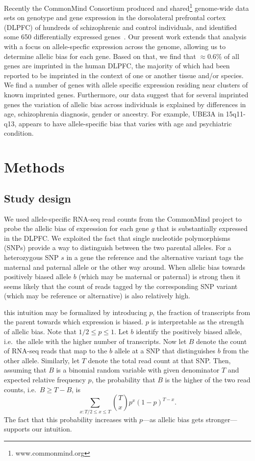 \documentclass[12pt,letterpaper]{article}
\begin{document}
Recently the CommonMind Consortium produced and
shared\footnote{www.commonmind.org} genome-wide data sets on genotype and gene
expression in the dorsolateral prefrontal cortex (DLPFC) of hundreds of
schizophrenic and control individuals, and identified some 650 differentially
expressed genes~\cite{Fromer2016a}. Our present work extends that analysis
with a focus on allele-specfic expression across the genome, allowing us to
determine allelic bias for each gene.  Based on that, we find that \(\approx
0.6\%\) of all genes are imprinted in the human DLPFC, the majority of which
had been reported to be imprinted in the context of one or another tissue
and/or species. We find a number of genes with allele specific expression
residing near clusters of known imprinted genes. Furthermore, our data suggest
that for several imprinted genes the variation of allelic bias across
individuals is explained by differences in age, schizophrenia diagnosis,
gender or ancestry.  For example, UBE3A in 15q11-q13, appears to have
allele-specific bias that varies with age and psychiatric condition.

\section{Methods}

\subsection{Study design}

We used allele-specific RNA-seq read counts from the CommonMind project to
probe the allelic bias of expression for each gene \(g\) that is
substantially expressed in the DLPFC.  We exploited the fact that single
nucleotide polymorphisms (SNPs) provide a way to distinguish between the two
parental alleles.  For a heterozygous SNP \(s\) in a gene the reference and the
alternative variant tags the maternal and paternal allele or the other way
around.  When allelic bias towards positively biased allele \(b\) (which may
be maternal or paternal) is strong then it seems likely that the count of
reads tagged by the corresponding SNP variant (which may be reference or
alternative) is also relatively high.

this intuition may be formalized by introducing \(p\), the fraction of
transcripts from the parent towards which expression is biased.  \(p\) is
interpretable as the strength of allelic bias.  Note that \(1/2\le p\le 1\).
Let \(b\) identify the positively biased allele, i.e.~the allele with the
higher number of transcripts.  Now let \(B\) denote the count of RNA-seq reads
that map to the \(b\) allele at a SNP that distinguishes \(b\) from the other
allele.  Similarly, let \(T\) denote the total read count at that SNP.  Then,
assuming that \(B\) is a binomial random variable with given denominator \(T\)
and expected relative frequency \(p\), the probability that \(B\) is the
higher of the two read counts, i.e.~\(B \ge T - B\), is \[\sum_{x:T/2\le x\le
T} {T \choose x} p^x (1 - p)^{T-x}.\] The fact that this probability increases
with \(p\)---as allelic bias gets stronger---supports our intuition.
\end{document}
